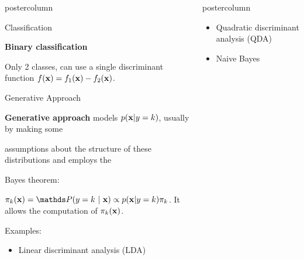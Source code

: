 \documentclass{beamer}
\begin{document}
\begin{frame}[fragile]{}
\begin{columns}
\begin{column}{.31\textwidth}
\begin{beamercolorbox}[center]{postercolumn}
\begin{minipage}{.98\textwidth}
{\begin{myblock}{Classification}
						\begin{codebox}
							 \textbf{Binary classification}
						\end{codebox}
            Only 2 classes, can use a single discriminant function $f(\mathbf{x}) = f_{1}(\mathbf{x}) - f_{2}(\mathbf{x})$.
          \end{myblock}
\begin{myblock}{Generative Approach}
\begin{codebox}
\textbf{Generative approach} models $p(\mathbf{x} | y= k)$, usually by making some
\end{codebox}

\begin{codebox}
assumptions about the structure of these distributions and employs the
\end{codebox}

\begin{codebox}
Bayes theorem:
  \end{codebox}
\hspace*{1ex}$\pikx = \postk \propto \pdfxyk \pik$. It allows the computation of \hspace*{1ex}$\pi_{k}(\mathbf{x})$.

\begin{codebox}
  Examples:
\end{codebox}
  
  \begin{itemize}[$\bullet$]     
  \setlength{\itemindent}{+.3in}
    \item Linear discriminant analysis (LDA)
  \end{itemize}
					\end{myblock}\vfill
          }
        \end{minipage}
          \end{beamercolorbox}
        \end{column}
	
	\begin{column}{.31\textwidth}
	\begin{beamercolorbox}[center]{postercolumn}
	
	\begin{minipage}{.98\textwidth}
\parbox[t][\columnheight]{\textwidth}{
  \begin{myblock}{}
  
  \begin{itemize}[$\bullet$]    
  \setlength{\itemindent}{+.3in}
    \item Quadratic discriminant analysis (QDA)
    \item Naive Bayes
  \end{itemize}
  

\end{myblock}}
\end{minipage}
\end{beamercolorbox}
\end{column}
\end{columns}
\end{frame}
\end{document}
